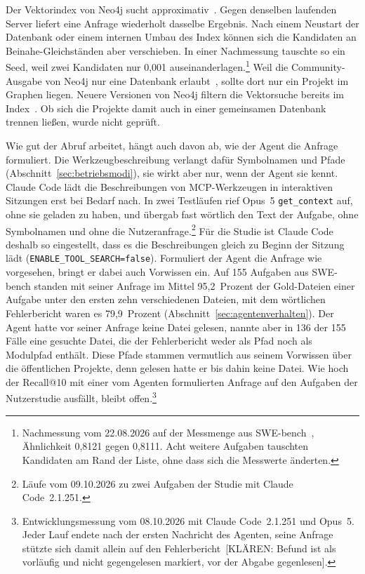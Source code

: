 Der Vektorindex von Neo4j sucht approximativ~\parencite{neo4jvector}. Gegen denselben laufenden Server liefert eine Anfrage wiederholt dasselbe Ergebnis. Nach einem Neustart der Datenbank oder einem internen Umbau des Index können sich die Kandidaten an Beinahe-Gleichständen aber verschieben. In einer Nachmessung tauschte so ein Seed, weil zwei Kandidaten nur 0,001 auseinanderlagen.\footnote{Nachmessung vom 22.08.2026 auf der Messmenge aus SWE-bench~\parencite{jimenez2024swebench}, Ähnlichkeit 0,8121 gegen 0,8111. Acht weitere Aufgaben tauschten Kandidaten am Rand der Liste, ohne dass sich die Messwerte änderten.} Weil die Community-Ausgabe von Neo4j nur eine Datenbank erlaubt~\parencite{neo4jdbadmin}, sollte dort nur ein Projekt im Graphen liegen. Neuere Versionen von Neo4j filtern die Vektorsuche bereits im Index~\parencite{neo4jvector}. Ob sich die Projekte damit auch in einer gemeinsamen Datenbank trennen ließen, wurde nicht geprüft.

Wie gut der Abruf arbeitet, hängt auch davon ab, wie der Agent die Anfrage formuliert. Die Werkzeugbeschreibung verlangt dafür Symbolnamen und Pfade (Abschnitt~\ref{sec:betriebsmodi}), sie wirkt aber nur, wenn der Agent sie kennt. Claude Code lädt die Beschreibungen von MCP-Werkzeugen in interaktiven Sitzungen erst bei Bedarf nach. In zwei Testläufen rief Opus~5 \texttt{get\_context} auf, ohne sie geladen zu haben, und übergab fast wörtlich den Text der Aufgabe, ohne Symbolnamen und ohne die Nutzeranfrage.\footnote{Läufe vom 09.10.2026 zu zwei Aufgaben der Studie mit Claude Code~2.1.251.} Für die Studie ist Claude Code deshalb so eingestellt, dass es die Beschreibungen gleich zu Beginn der Sitzung lädt (\texttt{ENABLE\_TOOL\_SEARCH=false}). Formuliert der Agent die Anfrage wie vorgesehen, bringt er dabei auch Vorwissen ein. Auf 155 Aufgaben aus SWE-bench standen mit seiner Anfrage im Mittel 95,2~Prozent der Gold-Dateien einer Aufgabe unter den ersten zehn verschiedenen Dateien, mit dem wörtlichen Fehlerbericht waren es 79,9~Prozent (Abschnitt~\ref{sec:agentenverhalten}). Der Agent hatte vor seiner Anfrage keine Datei gelesen, nannte aber in 136 der 155 Fälle eine gesuchte Datei, die der Fehlerbericht weder als Pfad noch als Modulpfad enthält. Diese Pfade stammen vermutlich aus seinem Vorwissen über die öffentlichen Projekte, denn gelesen hatte er bis dahin keine Datei. Wie hoch der Recall@10 mit einer vom Agenten formulierten Anfrage auf den Aufgaben der Nutzerstudie ausfällt, bleibt offen.\footnote{Entwicklungsmessung vom 08.10.2026 mit Claude Code~2.1.251 und Opus~5. Jeder Lauf endete nach der ersten Nachricht des Agenten, seine Anfrage stützte sich damit allein auf den Fehlerbericht~[KLÄREN: Befund ist als vorläufig und nicht gegengelesen markiert, vor der Abgabe gegenlesen].}
